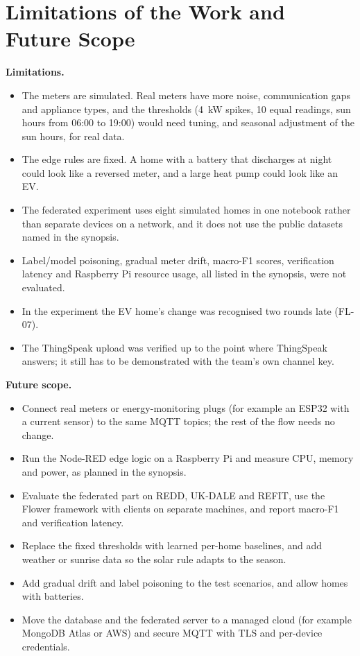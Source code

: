 \documentclass[12pt,a4paper,oneside]{report}
\begin{document}
\section{Limitations of the Work and Future Scope}

\textbf{Limitations.}
\begin{itemize}
\item The meters are simulated. Real meters have more noise, communication gaps and appliance types, and the thresholds (4~kW spikes, 10 equal readings, sun hours from 06:00 to 19:00) would need tuning, and seasonal adjustment of the sun hours, for real data.
\item The edge rules are fixed. A home with a battery that discharges at night could look like a reversed meter, and a large heat pump could look like an EV.
\item The federated experiment uses eight simulated homes in one notebook rather than separate devices on a network, and it does not use the public datasets named in the synopsis.
\item Label/model poisoning, gradual meter drift, macro-F1 scores, verification latency and Raspberry Pi resource usage, all listed in the synopsis, were not evaluated.
\item In the experiment the EV home's change was recognised two rounds late (FL-07).
\item The ThingSpeak upload was verified up to the point where ThingSpeak answers; it still has to be demonstrated with the team's own channel key.
\end{itemize}

\textbf{Future scope.}
\begin{itemize}
\item Connect real meters or energy-monitoring plugs (for example an ESP32 with a current sensor) to the same MQTT topics; the rest of the flow needs no change.
\item Run the Node-RED edge logic on a Raspberry Pi and measure CPU, memory and power, as planned in the synopsis.
\item Evaluate the federated part on REDD, UK-DALE and REFIT, use the Flower framework with clients on separate machines, and report macro-F1 and verification latency.
\item Replace the fixed thresholds with learned per-home baselines, and add weather or sunrise data so the solar rule adapts to the season.
\item Add gradual drift and label poisoning to the test scenarios, and allow homes with batteries.
\item Move the database and the federated server to a managed cloud (for example MongoDB Atlas or AWS) and secure MQTT with TLS and per-device credentials.
\end{itemize}
\end{document}
